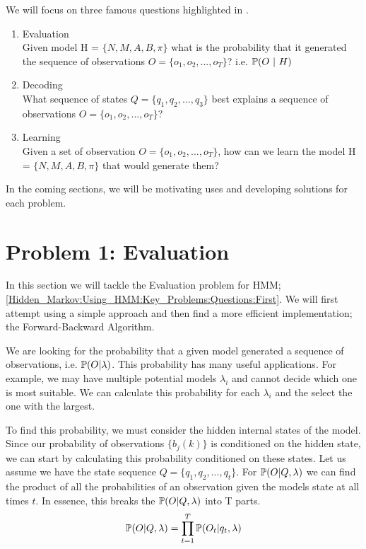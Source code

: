     We will focus on three famous questions highlighted in  \cite{Rabiner1986}. 
    \begin{enumerate}
        \label{Hidden_Markov:Using_HMM:Key_Problems:Questions}
        \item \label{Hidden_Markov:Using_HMM:Key_Problems:Questions:First} Evaluation \\ Given model H = $\{N,M,A,B, \pi\}$ what is the probability that it generated the sequence of observations $O = \{o_1,o_2,...,o_T\}$? i.e. $\mathbb{P} (O \ | \ H)$
        \item \label{Hidden_Markov:Using_HMM:Key_Problems:Questions:Second} Decoding \\ What sequence of states $Q = \{q_1, q_2,..., q_3\}$ best explains a sequence of observations $O  = \{o_1,o_2,...,o_T\}$?
        \item \label{Hidden_Markov:Using_HMM:Key_Problems:Questions:Third} Learning \\ Given a set of observation $O =   \{o_1,o_2,...,o_T\}$, how can we learn the model H = $\{N,M,A,B,  \pi\}$ that would generate them?
    \end{enumerate}
    
    In the coming sections, we will be motivating uses and developing  solutions for each problem. 


\section{Problem 1: Evaluation}
\label{Hidden_Markov:Evaluation}

In this section we will tackle the Evaluation problem for HMM; \ref{Hidden_Markov:Using_HMM:Key_Problems:Questions:First}. We will first attempt using a simple approach and then find a more efficient implementation; the Forward-Backward Algorithm.

We are looking for the probability that a given model generated a sequence of observations, i.e. $\mathbb{P} (O | \lambda)$. This probability has many useful applications. For example, we may have multiple potential models $\lambda_i$ and cannot decide which one is  most suitable. We can calculate this probability for each $\lambda_i$ and the select the one with the largest.

To find this probability, we must consider the hidden internal states of the model. Since our probability of observations $\{b_j(k)\}$ is conditioned on the hidden state, we can start by calculating this probability conditioned on these states. Let us assume we have the state sequence $Q = \{q_1,q_2,...,q_t\}$. For $\mathbb{P} (O | Q, \lambda)$ we can find the product of all the probabilities of an observation given the models state at all times $t$. In essence, this breaks the  $\mathbb{P} (O | Q, \lambda)$ into T parts. 
\begin{equation}
    \label{Hidden_Markov:Evaluation:Equation1}
    \mathbb{P} (O | Q, \lambda) = \prod_{t=1}^T \mathbb{P} (O_t | q_t, \lambda)
\end{equation}


